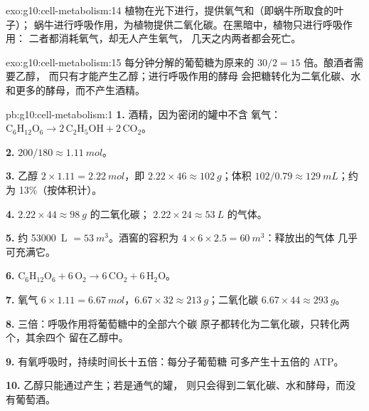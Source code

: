 \begin{solution}{exo:g10:cell-metabolism:14}
植物在光下进行，提供氧气和（即蜗牛所取食的叶子）；
蜗牛进行呼吸作用，为植物提供二氧化碳。在黑暗中，植物只进行呼吸作用：
二者都消耗氧气，却无人产生氧气，
几天之内两者都会死亡。
\end{solution}

\begin{solution}{exo:g10:cell-metabolism:15}
每分钟分解的葡萄糖为原来的 $30/2 = 15$ 倍。酿酒者需要乙醇，
而只有才能产生乙醇；进行呼吸作用的酵母
会把糖转化为二氧化碳、水和更多的酵母，而不产生酒精。
\end{solution}

\begin{solution}{pb:g10:cell-metabolism:1}
\textbf{1.} 酒精，因为密闭的罐中不含
氧气：$\mathrm{C_6H_{12}O_6} \to 2\,\mathrm{C_2H_5OH} +
2\,\mathrm{CO_2}$。

\textbf{2.} $200/180 \approx \qty{1.11}{mol}$。

\textbf{3.} 乙醇 $2 \times 1.11 = \qty{2.22}{mol}$，即 $2.22
\times 46 \approx \qty{102}{g}$；体积 $102/0.79 \approx
\qty{129}{mL}$；约为 13\%（按体积计）。

\textbf{4.} $2.22 \times 44 \approx \qty{98}{g}$ 的二氧化碳；
$2.22 \times 24 \approx \qty{53}{L}$ 的气体。

\textbf{5.} 约 \qty{53000}{L} $= \qty{53}{m^3}$。酒窖的容积为
$4 \times 6 \times 2.5 = \qty{60}{m^3}$：释放出的气体
几乎可充满它。

\textbf{6.} $\mathrm{C_6H_{12}O_6} + 6\,\mathrm{O_2} \to
6\,\mathrm{CO_2} + 6\,\mathrm{H_2O}$。

\textbf{7.} 氧气 $6 \times 1.11 = \qty{6.67}{mol}$，$6.67 \times 32
\approx \qty{213}{g}$；二氧化碳 $6.67 \times 44 \approx
\qty{293}{g}$。

\textbf{8.} 三倍：呼吸作用将葡萄糖中的全部六个碳
原子都转化为二氧化碳，只转化两个，其余四个
留在乙醇中。

\textbf{9.} 有氧呼吸时，持续时间长十五倍：每分子葡萄糖
可多产生十五倍的 ATP。

\textbf{10.} 乙醇只能通过产生；若是通气的罐，
则只会得到二氧化碳、水和酵母，而没有葡萄酒。


\end{solution}
